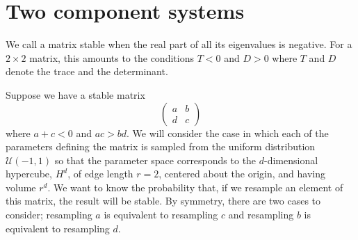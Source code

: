 \documentclass{amsart}
\theoremstyle{definition}
\theoremstyle{remark}
\numberwithin{equation}{section}
\begin{document}
\section{Two component systems}
We call a matrix stable when the real part of all its eigenvalues is negative.  For a $2 \times 2$ matrix, this amounts to the conditions $T < 0$ and $D >
0$ where $T$ and $D$ denote the trace and the determinant.

Suppose we have a stable matrix
$$
\begin{pmatrix}
a & b \\
d & c
\end{pmatrix}
$$
where $a + c < 0$ and $ac > bd$. We will consider the case in which each of the parameters defining the matrix is sampled from the uniform distribution $\mathcal{U}(-1,1)$ so that the parameter space corresponds to the $d$-dimensional hypercube, $H^d$, of edge length $r=2$, centered about the origin, and having volume $r^d$.  We want to know the probability that, if we resample an element of this matrix, the result will be stable.  By symmetry, there are two cases to consider; resampling $a$ is equivalent to resampling $c$ and resampling $b$ is equivalent
to resampling $d$.
\end{document}
